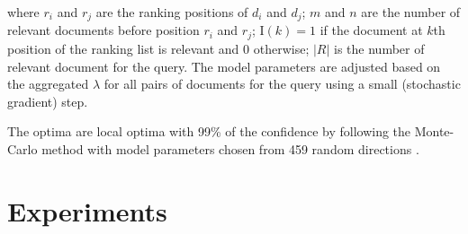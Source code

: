 where $r_i$ and $r_j$ are the ranking positions of $d_i$ and $d_j$; 
$m$ and $n$ are the number of relevant documents before position 
$r_i$ and $r_j$;
$\mathrm{I}(k)=1$ if the document at $k$th position of the ranking list 
is relevant and 0 otherwise; 
$|R|$ is the number of relevant document for the query. 
The model parameters are adjusted based on the aggregated $\lambda$ 
for all pairs of documents for the query using a small 
(stochastic gradient) step.

The optima are local optima with 99\% of the confidence by following 
the Monte-Carlo method with model parameters chosen from 459 random 
directions \cite{export:81144}.






\section{Experiments}
\label{sec:exp}

